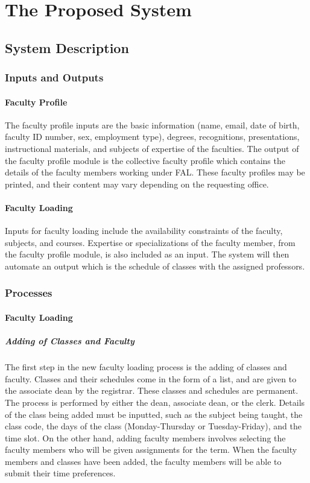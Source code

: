 \chapter{The Proposed System}

\section{System Description}

\subsection{Inputs and Outputs}

\subsubsection{Faculty Profile}
The faculty profile inputs are the basic information (name, email, date of birth, faculty ID number, sex, employment type), degrees, recognitions, presentations, instructional materials, and subjects of expertise of the faculties. The output of the faculty profile module is the collective faculty profile which contains the details of the faculty members working under FAL. These faculty profiles may be printed, and their content may vary depending on the requesting office.

\subsubsection{Faculty Loading}
Inputs for faculty loading include the availability constraints of the faculty, subjects, and courses. Expertise or specializations of the faculty member, from the faculty profile module, is also included as an input. The system will then automate an output which is the schedule of classes with the assigned professors.

\subsection{Processes}

    \subsubsection{Faculty Loading}
        \paragraph{Adding of Classes and Faculty}
        The first step in the new faculty loading process is the adding of classes and faculty. Classes and their schedules come in the form of a list, and are given to the associate dean by the registrar. These classes and schedules are permanent. The process is performed by either the dean, associate dean, or the clerk. Details of the class being added must be inputted, such as the subject being taught, the class code, the days of the class (Monday-Thursday or Tuesday-Friday), and the time slot. On the other hand, adding faculty members involves selecting the faculty members who will be given assignments for the term. When the faculty members and classes have been added, the faculty members will be able to submit their time preferences.
        
